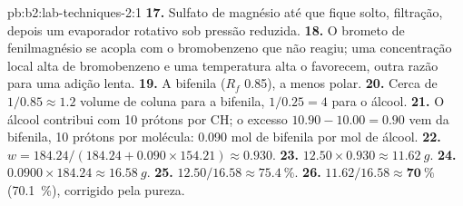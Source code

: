 \begin{solution}{pb:b2:lab-techniques-2:1}
\textbf{17.} Sulfato de magnésio até que fique solto, filtração, depois um evaporador rotativo sob
pressão reduzida.
\textbf{18.} O brometo de fenilmagnésio se acopla com o bromobenzeno que não reagiu; uma concentração local
alta de bromobenzeno e uma temperatura alta o favorecem, outra razão para uma adição lenta.
\textbf{19.} A bifenila ($R_f$ 0.85), a menos polar.
\textbf{20.} Cerca de $1/0.85 \approx 1.2$ volume de coluna para a bifenila, $1/0.25 = 4$ para o álcool.
\textbf{21.} O álcool contribui com 10 prótons  por CH; o excesso $10.90 - 10.00 = 0.90$ vem da
bifenila, 10 prótons por molécula: 0.090 mol de bifenila por mol de álcool.
\textbf{22.} $w = 184.24/(184.24 + 0.090 \times 154.21) \approx 0.930$.
\textbf{23.} $12.50 \times 0.930 \approx \qty{11.62}{g}$.
\textbf{24.} $0.0900 \times 184.24 \approx \qty{16.58}{g}$.
\textbf{25.} $12.50/16.58 \approx 75.4~\%$.
\textbf{26.} $11.62/16.58 \approx \boldsymbol{70~\%}$ (70.1~\%), corrigido pela pureza.
\end{solution}
